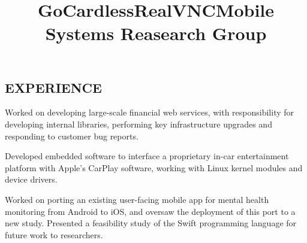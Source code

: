 \documentclass[margin]{res}
\begin{document}
\begin{resume}
\section{EXPERIENCE}

\dates{}
\title{\textbf{GoCardless}}
\begin{position}
Worked on developing large-scale financial web services, with responsibility for
developing internal libraries, performing key infrastructure upgrades and
responding to customer bug reports.
\end{position}

\dates{}
\title{\textbf{RealVNC}}
\begin{position}
Developed embedded software to interface a proprietary in-car entertainment
platform with Apple's CarPlay software, working with Linux kernel modules and
device drivers.
\end{position}

\dates{}
\title{\textbf{Mobile Systems Reasearch Group}}
\begin{position}
Worked on porting an existing user-facing mobile app for mental health
monitoring from Android to iOS, and oversaw the deployment of this port to a new
study. Presented a feasibility study of the Swift programming language for
future work to researchers.
\end{position}

\end{resume}
\end{document}
